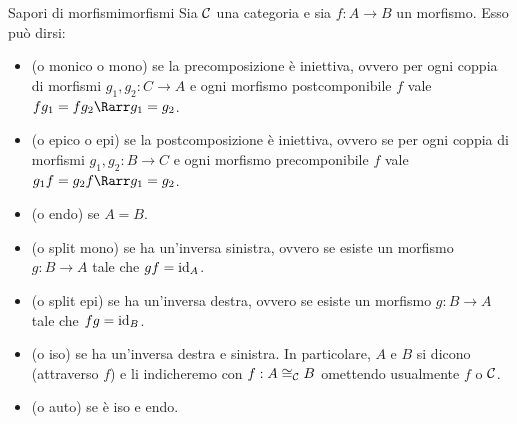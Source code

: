 \documentclass{article}
\renewcommand\C{\mc{C}}
\begin{document}
\begin{definition}{Sapori di morfismi}{morfismi}
    Sia $\C$ una categoria e sia $f: A\to B$ un morfismo. Esso può dirsi:\begin{itemize}
        \item {} (o monico o mono) se la precomposizione è iniettiva, ovvero per ogni coppia di morfismi $g_1, g_2 : C\to A$ e ogni morfismo postcomponibile $f$ vale $fg_1 = fg_2 \Rarr g_1=g_2$.
        \item {} (o epico o epi) se la postcomposizione è iniettiva, ovvero se per ogni coppia di morfismi $g_1, g_2 : B\to C$ e ogni morfismo precomponibile $f$ vale $g_1f = g_2f \Rarr g_1=g_2$.
        \item {} (o endo) se $A=B$.
        \item {} (o split mono) se ha un'inversa sinistra, ovvero se esiste un morfismo $g:B\to A$ tale che $gf = \operatorname{id}_A$.
        \item {} (o split epi) se ha un'inversa destra, ovvero se esiste un morfismo $g:B\to A$ tale che $fg = \operatorname{id}_B$.
        \item {} (o iso) se ha un'inversa destra e sinistra. In particolare, $A$ e $B$ si dicono  (attraverso $f$) e li indicheremo con $f:A\cong_\C B$ omettendo usualmente $f$ o $\C$.
        \item {} (o auto) se è iso e endo.
    \end{itemize}    
\end{definition}
\end{document}
